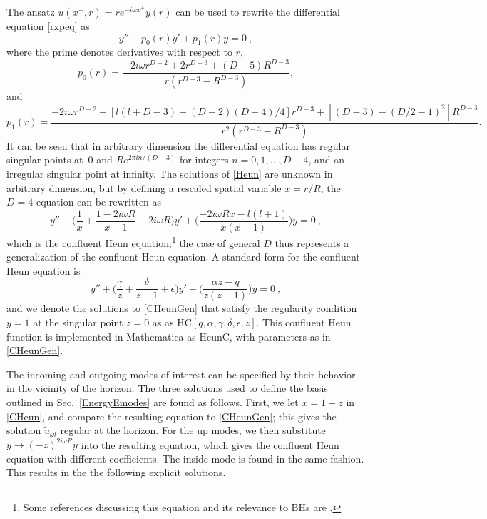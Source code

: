 \documentclass[11pt]{article}
\numberwithin{equation}{section}
\newcommand{\beq}{\begin{equation}}
\newcommand{\eeq}{\end{equation}}
\begin{document}
The ansatz $u(x^+, r) = r e^{-i \omega x^+} y(r)$ can be used to rewrite the differential equation \eqref{rxpeq} as 
\beq\label{Heun}
y''+p_0(r)y'+ p_1(r)y = 0\ ,
\eeq
where the prime denotes derivatives with respect to $r$,
\beq
p_0(r) = \frac{-2 i \omega r^{D-2}+2r^{D-3}+(D-5)R^{D-3}}{r(r^{D-3}-R^{D-3})},
\eeq
and
\beq
p_1(r)=\frac{-2 i \omega r^{D-2}-\left[ l(l+D-3)  + (D-2)(D-4)/4\right]r^{D-3} + \left[(D-3)-(D/2-1)^2\right] R^{D-3}}
{r^2(r^{D-3}-R^{D-3})}.
\eeq
It can be seen that in arbitrary dimension the differential equation has regular singular points at~$0$ and $R e^{2 \pi i n/ (D-3)}$ for integers $n = 0, 1,..., D-4$, and an irregular singular point at infinity. The solutions of \eqref{Heun} are unknown in arbitrary dimension, but by defining a rescaled spatial variable $x = r/R$, the $D=4$ equation can be rewritten  as
\beq\label{CHeun}
y''+\Big(\frac{1}{x}+\frac{1-2 i \omega R}{x-1}-2 i \omega R\Big)y'+ \Big(\frac{-2i \omega R x-l(l+1)}{x(x-1)}\Big)y = 0\ ,
\eeq
which is the confluent Heun equation;\footnote{Some references discussing this equation and its relevance to BHs are \cite{Leav,Fizi1,Fizi2,PhPe}.}  the case of general $D$ thus represents a generalization of the confluent Heun equation.  A standard form for the confluent Heun equation is
\beq\label{CHeunGen}
y''+\Big(\frac{\gamma}{z}+\frac{\delta}{z-1}+\epsilon\Big)y'+ \Big(\frac{\alpha z-q}{z(z-1)}\Big)y = 0\ ,
\eeq
and we denote the solutions to \eqref{CHeunGen} that satisfy the  regularity condition $y= 1$ at the singular point $z=0$ as 
as $\mathrm{HC}[q, \alpha, \gamma, \delta, \epsilon, z]$.  This confluent Heun function is  implemented in Mathematica as $\mathrm{HeunC}$, with  parameters as in \eqref{CHeunGen}. 

The incoming and outgoing modes of interest can be specified by their behavior in the vicinity of the horizon. The three solutions  used to define the basis outlined in 
Sec.~\ref{EnergyEmodes} are found as follows.  First, we let $x=1-z$ in \eqref{CHeun}, and compare the resulting equation to \eqref{CHeunGen}; this gives the solution $\tilde u_{\omega l}$ regular at the horizon.  For the up modes, we then substitute $y\rightarrow (-z)^{2i\omega R} y$ into the resulting equation, which gives the confluent Heun equation with different coefficients.  The inside mode is found in the same fashion.  This results in the the following explicit solutions.
\end{document}
